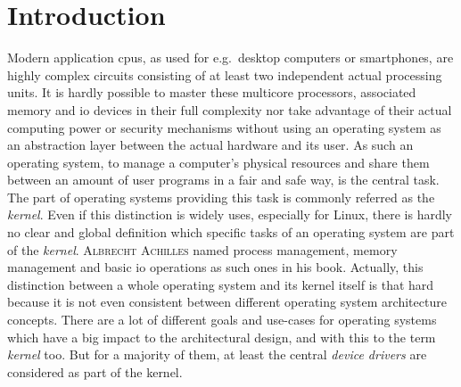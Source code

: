 

\chapter{Introduction}\label{ch:introduction}



Modern application \acp{cpu}, as used for e.g.\ desktop computers or smartphones, are highly complex circuits consisting of at least two independent actual processing units.
It is hardly possible to master these multicore processors, associated memory and \ac{io} devices in their full complexity nor take advantage of their actual computing power or security mechanisms without using an operating system as an abstraction layer between the actual hardware and its user.
As such an operating system, to manage a computer's physical resources and share them between an amount of user programs in a fair and safe way, is the central task.
The part of operating systems providing this task is commonly referred as the \textit{kernel}.  
Even if this distinction is widely uses, especially for Linux, there is hardly no clear and global definition which specific tasks of an operating system are part of the \textit{kernel}.
\textsc{Albrecht Achilles} named process management, memory management and basic \ac{io} operations as such ones in his book\cite{achilles2006betriebssysteme}.
Actually, this distinction between a whole operating system and its kernel itself is that hard because it is not even consistent between different operating system architecture concepts.
There are a lot of different goals and use-cases for operating systems which have a big impact to the architectural design, and with this to the term \textit{kernel} too. 
But for a majority of them, at least the central \textit{device drivers} are considered as part of the kernel. 


